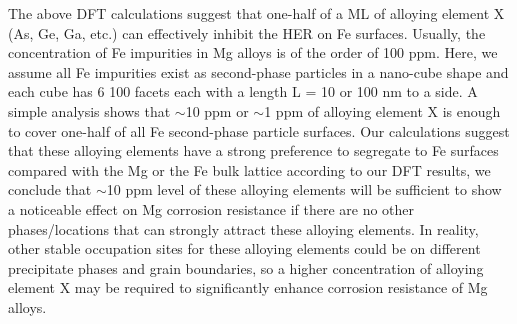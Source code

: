 The above DFT calculations suggest that one-half of a \ac{ML} of alloying element X (As, Ge, Ga, etc.) can effectively inhibit the HER on Fe surfaces. Usually, the concentration of Fe impurities in Mg alloys is of the order of 100 ppm. Here, we assume all Fe impurities exist as second-phase particles in a nano-cube shape and each cube has 6 {100} facets each with a length L = 10 or 100 nm to a side. A simple analysis shows that $\sim$10 ppm or $\sim$1 ppm of alloying element X is enough to cover one-half of all Fe second-phase particle surfaces. Our calculations suggest that these alloying elements have a strong preference to segregate to Fe surfaces compared with the Mg or the Fe bulk lattice according to our DFT results, we conclude that $\sim$10 ppm level of these alloying elements will be sufficient to show a noticeable effect on Mg corrosion resistance if there are no other phases/locations that can strongly attract these alloying elements. In reality, other stable occupation sites for these alloying elements could be on different precipitate phases and grain boundaries, so a higher concentration of alloying element X may be required to significantly enhance corrosion resistance of Mg alloys.

